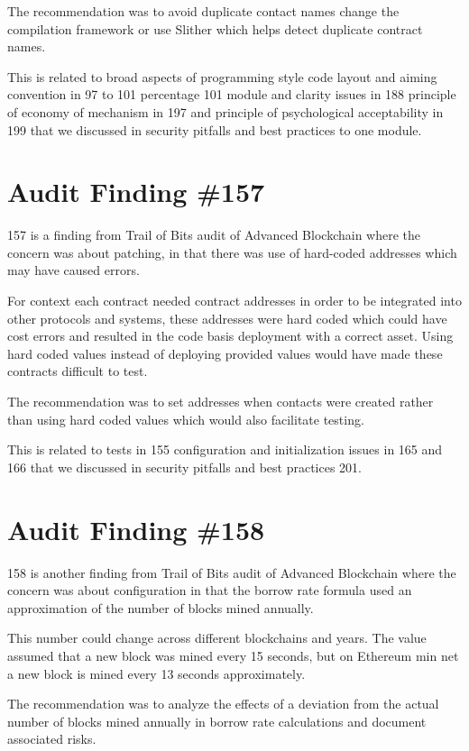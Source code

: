 The recommendation was to avoid duplicate contact names change the compilation framework or use Slither which helps detect duplicate contract names.

This is related to broad aspects of programming style code layout and aiming convention in 97 to 101 percentage 101 module and clarity issues in 188 principle of economy of mechanism in 197 and principle of psychological acceptability in 199 that we discussed in security pitfalls and best practices to one module.

\section{Audit Finding \#157}

157 is a finding from Trail of Bits audit of Advanced Blockchain where the concern was about patching, in that there was use of hard-coded addresses which may have caused errors. 

For context each contract needed contract addresses in order to be integrated into other protocols and systems, these addresses were hard coded which could have cost errors and resulted in the code basis deployment with a correct asset. Using hard coded values instead of deploying provided values would have made these contracts difficult to test.

The recommendation was to set addresses when contacts were created rather than using hard coded values which would also facilitate testing.

This is related to tests in 155 configuration and initialization issues in 165 and 166 that we discussed in security pitfalls and best practices 201.

\section{Audit Finding \#158}

158 is another finding from Trail of Bits audit of Advanced Blockchain where the concern was about configuration in that the borrow rate formula used an approximation of the number of blocks mined annually.

This number could change across different blockchains and years. The value assumed that a new block was mined every 15 seconds, but on Ethereum min net a new block is mined every 13 seconds approximately.

The recommendation was to analyze the effects of a deviation from the actual number of blocks mined annually in borrow rate calculations and document associated risks.


